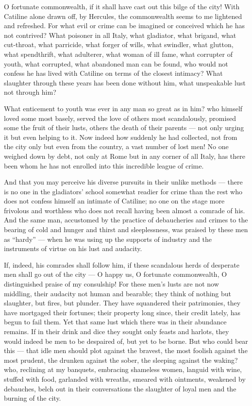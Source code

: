  O fortunate commonwealth, if it shall have cast out this bilge of the city! With Catiline alone drawn off, by Hercules, the commonwealth seems to me lightened and refreshed. For what evil or crime can be imagined or conceived which he has not contrived? What poisoner in all Italy, what gladiator, what brigand, what cut-throat, what parricide, what forger of wills, what swindler, what glutton, what spendthrift, what adulterer, what woman of ill fame, what corrupter of youth, what corrupted, what abandoned man can be found, who would not confess he has lived with Catiline on terms of the closest intimacy? What slaughter through these years has been done without him, what unspeakable lust not through him?

 What enticement to youth was ever in any man so great as in him? who himself loved some most basely, served the love of others most scandalously, promised some the fruit of their lusts, others the death of their parents --- not only urging it but even helping to it. Now indeed how suddenly he had collected, not from the city only but even from the country, a vast number of lost men! No one weighed down by debt, not only at Rome but in any corner of all Italy, has there been whom he has not enrolled into this incredible league of crime.

 And that you may perceive his diverse pursuits in their unlike methods --- there is no one in the gladiators' school somewhat readier for crime than the rest who does not confess himself an intimate of Catiline; no one on the stage more frivolous and worthless who does not recall having been almost a comrade of his. And the same man, accustomed by the practice of debaucheries and crimes to the bearing of cold and hunger and thirst and sleeplessness, was praised by these men as ``hardy'' --- when he was using up the supports of industry and the instruments of virtue on his lust and audacity.

 If, indeed, his comrades shall follow him, if these scandalous herds of desperate men shall go out of the city --- O happy us, O fortunate commonwealth, O distinguished praise of my consulship! For these men's lusts are not now middling, their audacity not human and bearable; they think of nothing but slaughter, but fires, but plunder. They have squandered their patrimonies, they have mortgaged their fortunes; their property long since, their credit lately, has begun to fail them. Yet that same lust which there was in their abundance remains. If in their drink and dice they sought only feasts and harlots, they would indeed be men to be despaired of, but yet to be borne. But who could bear this --- that idle men should plot against the bravest, the most foolish against the most prudent, the drunken against the sober, the sleeping against the waking? who, reclining at my banquets, embracing shameless women, languid with wine, stuffed with food, garlanded with wreaths, smeared with ointments, weakened by debauches, belch out in their conversations the slaughter of loyal men and the burning of the city.

